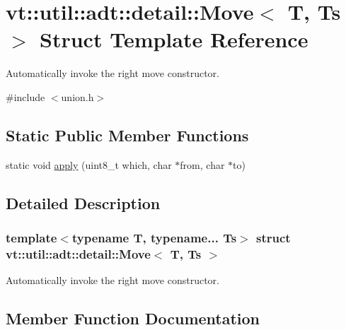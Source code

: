 \hypertarget{structvt_1_1util_1_1adt_1_1detail_1_1_move}{}\section{vt\+:\+:util\+:\+:adt\+:\+:detail\+:\+:Move$<$ T, Ts $>$ Struct Template Reference}
\label{structvt_1_1util_1_1adt_1_1detail_1_1_move}


Automatically invoke the right move constructor.  




{\ttfamily \#include $<$union.\+h$>$}

\subsection*{Static Public Member Functions}
\begin{DoxyCompactItemize}
\item 
static void \hyperlink{structvt_1_1util_1_1adt_1_1detail_1_1_move_adfd7a1ecefb4342d7626db1f672666c5}{apply} (uint8\+\_\+t which, char $\ast$from, char $\ast$to)
\end{DoxyCompactItemize}


\subsection{Detailed Description}
\subsubsection*{template$<$typename T, typename... Ts$>$\newline
struct vt\+::util\+::adt\+::detail\+::\+Move$<$ T, Ts $>$}

Automatically invoke the right move constructor. 

\subsection{Member Function Documentation}
\mbox{\label{structvt_1_1util_1_1adt_1_1detail_1_1_move_adfd7a1ecefb4342d7626db1f672666c5}} 
